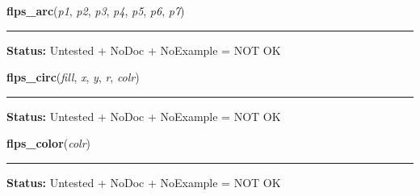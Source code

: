     \label{xformslib:library:flps_arc}

    \vspace{0.5ex}

\hspace{.8\funcindent}\begin{boxedminipage}{\funcwidth}

    \raggedright \textbf{flps\_arc}(\textit{p1}, \textit{p2}, \textit{p3}, \textit{p4}, \textit{p5}, \textit{p6}, \textit{p7})

    \vspace{-1.5ex}

    \rule{\textwidth}{0.5\fboxrule}
\setlength{\parskip}{2ex}
\setlength{\parskip}{1ex}
\textbf{Status:} Untested + NoDoc + NoExample = NOT OK



    \end{boxedminipage}

    \label{xformslib:library:flps_circ}

    \vspace{0.5ex}

\hspace{.8\funcindent}\begin{boxedminipage}{\funcwidth}

    \raggedright \textbf{flps\_circ}(\textit{fill}, \textit{x}, \textit{y}, \textit{r}, \textit{colr})

    \vspace{-1.5ex}

    \rule{\textwidth}{0.5\fboxrule}
\setlength{\parskip}{2ex}
\setlength{\parskip}{1ex}
\textbf{Status:} Untested + NoDoc + NoExample = NOT OK



    \end{boxedminipage}

    \label{xformslib:library:flps_color}

    \vspace{0.5ex}

\hspace{.8\funcindent}\begin{boxedminipage}{\funcwidth}

    \raggedright \textbf{flps\_color}(\textit{colr})

    \vspace{-1.5ex}

    \rule{\textwidth}{0.5\fboxrule}
\setlength{\parskip}{2ex}
\setlength{\parskip}{1ex}
\textbf{Status:} Untested + NoDoc + NoExample = NOT OK



    \end{boxedminipage}

